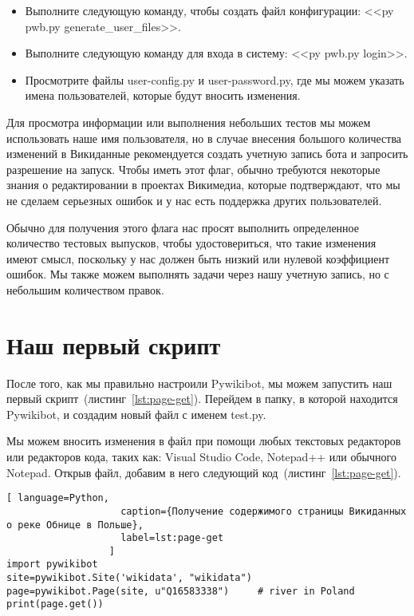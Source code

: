 \begin{itemize}
  \setlength{\itemindent}{2em}
  \item Выполните следующую команду, чтобы создать файл конфигурации: <<py pwb.py generate\_user\_files>>.
  \item Выполните следующую команду для входа в систему: <<py pwb.py login>>.
  \item Просмотрите файлы user-config.py и user-password.py, где мы можем указать имена пользователей, которые будут вносить изменения.
\end{itemize}

Для просмотра информации или выполнения небольших тестов мы можем использовать наше имя пользователя, но в случае внесения большого количества изменений в Викиданные рекомендуется создать учетную запись бота и запросить разрешение на запуск. Чтобы иметь этот флаг, обычно требуются некоторые знания о редактировании в проектах Викимедиа, которые подтверждают, что мы не сделаем серьезных ошибок и у нас есть поддержка других пользователей.

Обычно для получения этого флага нас просят выполнить определенное количество тестовых выпусков, чтобы удостовериться, что такие изменения имеют смысл, поскольку у нас должен быть низкий или нулевой коэффициент ошибок. Мы также можем выполнять задачи через нашу учетную запись, но с небольшим количеством правок.

\section{Наш первый скрипт}
\label{sec:firstScript}
После того, как мы правильно настроили Pywikibot, мы можем запустить 
наш первый скрипт~(листинг~\ref{lst:page-get}). 
Перейдем в папку, в которой находится Pywikibot, и создадим новый файл с именем test.py.

Мы можем вносить изменения в файл при помощи любых текстовых редакторов 
или редакторов кода, таких как: 
Visual Studio Code, Notepad++ или обычного Notepad. 
Открыв файл, добавим в него следующий код~(листинг~\ref{lst:page-get}).

%
\begin{lstlisting}[ language=Python,
                    caption={Получение содержимого страницы Викиданных о реке Обнице в Польше},
                    label=lst:page-get
                  ]
import pywikibot
site=pywikibot.Site('wikidata', "wikidata")
page=pywikibot.Page(site, u"Q16583338")     # river in Poland
print(page.get())
\end{lstlisting}


